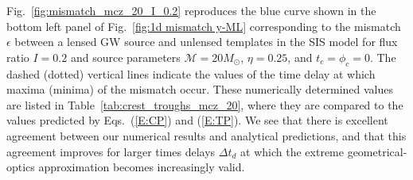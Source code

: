 \documentclass[floats,floatfix,showpacs,amssymb,prd,twocolumn,superscriptaddress,nofootinbib,nolongbibliography,reprint]{revtex4-2}
\begin{document}
Fig.~\ref{fig:mismatch_mcz_20_I_0.2} reproduces the blue curve shown in the bottom left panel of Fig.~\ref{fig:1d mismatch y-ML} corresponding to the mismatch $\epsilon$ between a lensed GW source and unlensed templates in the SIS model for flux ratio $I = 0.2$ and source parameters $\mathcal{M} = 20 M_\odot$, $\eta = 0.25$, and $t_c = \phi_c = 0$. The dashed (dotted) vertical lines indicate the values of the time delay at which maxima (minima) of the mismatch occur. These numerically determined values are listed in Table~\ref{tab:crest_troughs_mcz_20}, where they are compared to the values predicted by Eqs.~(\ref{E:CP}) and (\ref{E:TP}).  We see that there is excellent agreement between our numerical results and analytical predictions, and that this agreement improves for larger times delays $\Delta t_d$ at which the extreme geometrical-optics approximation becomes increasingly valid.




\end{document}
